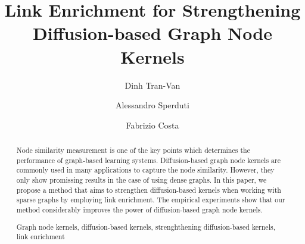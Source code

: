 \documentclass[runningheads,a4paper]{llncs}
\newcommand{\keywords}[1]{\par\addvspace\baselineskip
\noindent\keywordname\enspace\ignorespaces#1}
\begin{document}
\mainmatter  %

\title{Link Enrichment for Strengthening Diffusion-based Graph Node Kernels}


%
%
\author{Dinh Tran-Van \and Alessandro Sperduti\and Fabrizio Costa}

%


%
%

\maketitle


\begin{abstract}
Node similarity measurement is one of the key points which determines the performance of graph-based learning systems. Diffusion-based graph node kernels are commonly used in many applications to capture the node similarity. However, they only show promissing results in the case of using dense graphs. In this paper, we propose a method that aims to strengthen diffusion-based kernels when working with sparse graphs by employing link enrichment. The empirical experiments show that our method considerably improves the power of diffusion-based graph node kernels. 

\keywords{Graph node kernels, diffusion-based kernels, strenghthening diffusion-based kernels, link enrichment}
\end{abstract}
\end{document}

